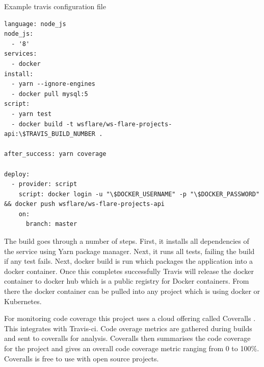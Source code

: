 \begin{listing}[H]
    \caption{Example travis configuration file}
    \label{code:example-travis-yaml-file}
\begin{verbatim}
language: node_js
node_js:
  - '8'
services:
  - docker
install:
  - yarn --ignore-engines
  - docker pull mysql:5
script:
  - yarn test
  - docker build -t wsflare/ws-flare-projects-api:\$TRAVIS_BUILD_NUMBER .

after_success: yarn coverage

deploy:
  - provider: script
    script: docker login -u "\$DOCKER_USERNAME" -p "\$DOCKER_PASSWORD" && docker push wsflare/ws-flare-projects-api
    on:
      branch: master
\end{verbatim}
\end{listing}

The build goes through a number of steps. First, it installs all dependencies of the service using Yarn package manager. Next, it runs all tests, failing the build if any test fails. Next, docker build is run which packages the application into a docker container. Once this completes successfully Travis will release the docker container to docker hub which is a public registry for Docker containers. From there the docker container can be pulled into any project which is using docker or Kubernetes.

For monitoring code coverage this project uses a cloud offering called Coveralls \cite{coveralls}. This integrates with Travis-ci. Code overage metrics are gathered during builds and sent to coveralls for analysis. Coveralls then summarises the code coverage for the project and gives an overall code coverage metric ranging from 0 to 100\%. Coveralls is free to use with open source projects.